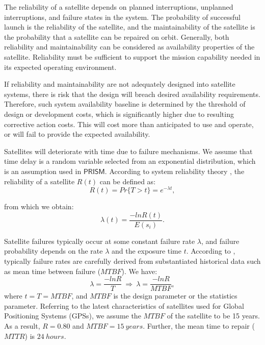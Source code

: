 \documentclass[preprint,12pt]{qrei}
\begin{document}
The reliability of a satellite depends on planned interruptions, unplanned interruptions, and failure states in the system. The probability of successful launch is the reliability of the satellite, and the maintainability of the satellite is the probability that a satellite can be repaired on orbit. Generally, both reliability and maintainability can be considered as availability properties of the satellite. Reliability must be sufficient to support the mission capability needed in its expected operating environment.

If reliability and maintainability are not adequately designed into satellite systems, there is risk that the design will breach desired availability requirements. Therefore, such system availability baseline is determined by the threshold of design or development costs, which is significantly higher due to resulting corrective action costs. This will cost more than anticipated to use and operate, or will fail to provide the expected availability.

Satellites will deteriorate with time due to failure mechanisms. We assume that time delay is a random variable selected from an exponential distribution, which is an assumption used in $\mathsf{PRISM}$. According to system reliability theory \cite{HR09}, the reliability of a satellite $R(t)$ can be defined as:
\begin{equation}
R(t)=Pr\{T>t\}=e^{-\lambda t},
\end{equation}

\noindent from which we obtain:
\begin{equation}
\lambda(t)=\frac{-lnR(t)}{E(s_{i})}.
\end{equation}

Satellite failures typically occur at some constant failure rate $\lambda$, and failure probability depends on the rate $\lambda$ and the exposure time $t$. According to \cite{Czi13}, typically failure rates are carefully derived from substantiated historical data such as mean time between failure ($MTBF$). We have:
\begin{equation}
\lambda=\frac{-lnR}{T}\ \Longrightarrow\ \lambda=\frac{-lnR}{MTBF},
\label{l4}
\end{equation}
where $t=T=MTBF$, and $MTBF$ is the design parameter or the statistics parameter. Referring to the latest characteristics of satellites used for Global Positioning Systems (GPSs), we assume the $MTBF$ of the satellite to be 15 years. As a result, $R=0.80$ and $MTBF=15\ years$. Further, the mean time to repair ($MTTR$) is $24\ hours$.
\end{document}
